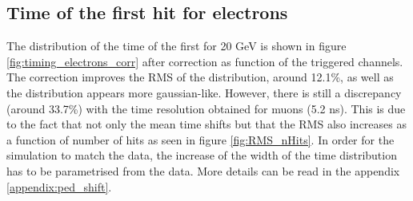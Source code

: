 \subsection{Time of the first hit for electrons}
\label{subsec:Electron_Final}

The distribution of the time of the first for 20 GeV is shown in figure \ref{fig:timing_electrons_corr} after correction as function of the triggered channels. The correction improves the RMS of the distribution, around 12.1\%, as well as the distribution appears more gaussian-like. However, there is still a discrepancy (around 33.7\%) with the time resolution obtained for muons (5.2 ns). This is due to the fact that not only the mean time shifts but that the RMS also increases as a function of number of hits as seen in figure \ref{fig:RMS_nHits}. In order for the simulation to match the data, the increase of the width of the time distribution has to be parametrised from the data. More details can be read in the appendix \ref{appendix:ped_shift}.

